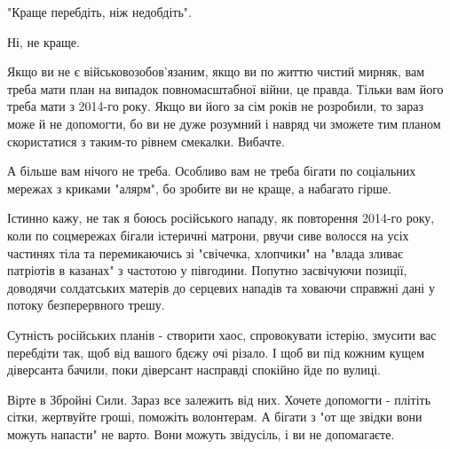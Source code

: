 "Краще перебдіть, ніж недобдіть".

Ні, не краще.

Якщо ви не є військовозобов'язаним, якщо ви по життю чистий мирняк, вам треба
мати план на випадок повномасштабної війни, це правда. Тільки вам його треба
мати з 2014-го року. Якщо ви його за сім років не розробили, то зараз може й не
допомогти, бо ви не дуже розумний і навряд чи зможете тим планом скористатися з
таким-то рівнем смекалки. Вибачте.

А більше вам нічого не треба. Особливо вам не треба бігати по соціальних
мережах з криками "алярм", бо зробите ви не краще, а набагато гірше. 

Істинно кажу, не так я боюсь російського нападу, як повторення 2014-го року,
коли по соцмережах бігали істеричні матрони, рвучи сиве волосся на усіх
частинях тіла та перемикаючись зі "свічечка, хлопчики" на "влада зливає
патріотів в казанах" з частотою у півгодини. Попутно засвічуючи позиції,
доводячи солдатських матерів до серцевих нападів та ховаючи справжні дані у
потоку безперервного трешу.

Сутність російських планів - створити хаос, спровокувати істерію, змусити вас
перебдіти так, щоб від вашого бдєжу очі різало. І щоб ви під кожним кущем
діверсанта бачили, поки діверсант насправді спокійно йде по вулиці.

Вірте в Збройні Сили. Зараз все залежить від них. Хочете допомогти - плітіть
сітки, жертвуйте гроші, поможіть волонтерам. А бігати з "от ще звідки вони
можуть напасти" не варто. Вони можуть звідусіль, і ви не допомагаєте.

